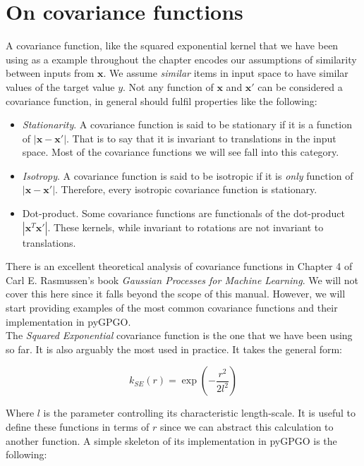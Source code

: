 \documentclass[10pt,a4paper,twoside]{book}
\begin{document}
\section{On covariance functions}

A covariance function, like the squared exponential kernel that we have been using as a example throughout the chapter encodes our assumptions of similarity between inputs from $\boldsymbol{x}$. We assume \textit{similar} items in input space to have similar values of the target value $y$. Not any function of $\boldsymbol{x}$ and $\boldsymbol{x'}$ can be considered a covariance function, in general should fulfil properties like the following:

\begin{itemize}
\item \textit{Stationarity}. A covariance function is said to be stationary if it is a function of $|\boldsymbol{x} - \boldsymbol{x'}|$. That is to say that it is invariant to translations in the input space. Most of the covariance functions we will see fall into this category.
\item \textit{Isotropy}. A covariance function is said to be isotropic if it is \textit{only} function of  $|\boldsymbol{x} - \boldsymbol{x'}|$. Therefore, every isotropic covariance function is stationary.
\item Dot-product. Some covariance functions are functionals of the dot-product $|\boldsymbol{x}^T \boldsymbol{x'}|$. These kernels, while invariant to rotations are not invariant to translations.
\end{itemize}

There is an excellent theoretical analysis of covariance functions in Chapter 4 of Carl E. Rasmussen's book \textit{Gaussian Processes for Machine Learning}. We will not cover this here since it falls beyond the scope of this manual. However, we will start providing examples of the most common covariance functions and their implementation in pyGPGO.\\

The \textit{Squared Exponential} covariance function is the one that we have been using so far. It is also arguably the most used in practice. It takes the general form:

\begin{equation}
k_{SE}(r) = \exp\left(-\dfrac{r^2}{2l^2} \right)
\end{equation}

Where $l$ is the parameter controlling its characteristic length-scale. It is useful to define these functions in terms of $r$ since we can abstract this calculation to another function. A simple skeleton of its implementation in pyGPGO is the following:
\end{document}
